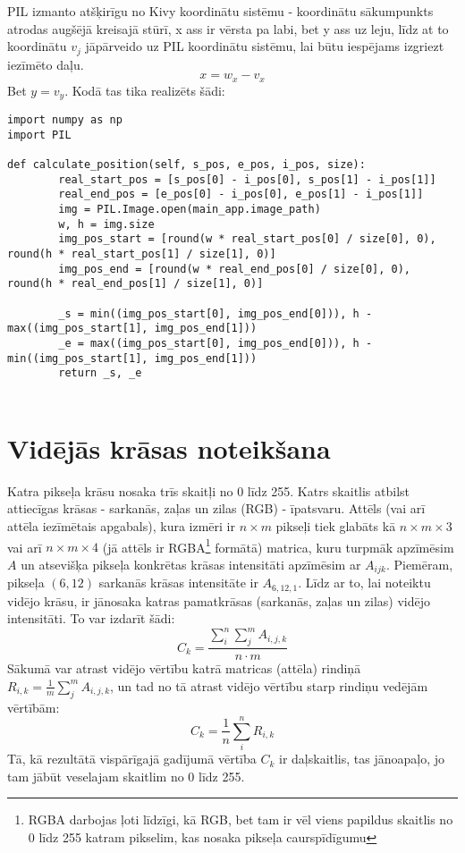 \documentclass{article}
\begin{document}
PIL izmanto atšķirīgu no Kivy koordinātu sistēmu - koordinātu sākumpunkts atrodas augšējā kreisajā stūrī, x ass ir vērsta pa labi, bet y ass uz leju, līdz at to koordinātu $v_j$ jāpārveido uz PIL koordinātu sistēmu, lai būtu iespējams izgriezt iezīmēto daļu.
$$
    x = w_x - v_x
$$
Bet $y = v_y$. Kodā tas tika realizēts šādi:

\begin{lstlisting}
import numpy as np
import PIL

def calculate_position(self, s_pos, e_pos, i_pos, size):
        real_start_pos = [s_pos[0] - i_pos[0], s_pos[1] - i_pos[1]]
        real_end_pos = [e_pos[0] - i_pos[0], e_pos[1] - i_pos[1]]
        img = PIL.Image.open(main_app.image_path)
        w, h = img.size
        img_pos_start = [round(w * real_start_pos[0] / size[0], 0), round(h * real_start_pos[1] / size[1], 0)]
        img_pos_end = [round(w * real_end_pos[0] / size[0], 0), round(h * real_end_pos[1] / size[1], 0)]

        _s = min((img_pos_start[0], img_pos_end[0])), h - max((img_pos_start[1], img_pos_end[1]))
        _e = max((img_pos_start[0], img_pos_end[0])), h - min((img_pos_start[1], img_pos_end[1]))
        return _s, _e
    
\end{lstlisting}

\section{Vidējās krāsas noteikšana}

Katra pikseļa krāsu nosaka trīs skaitļi no 0 līdz 255. Katrs skaitlis atbilst attiecīgas krāsas - sarkanās, zaļas un zilas (RGB) - īpatsvaru. Attēls (vai arī attēla iezīmētais apgabals), kura izmēri ir $n\times m$ pikseļi tiek glabāts kā $n\times m \times 3$ vai arī $n \times m \times 4$ (jā attēls ir RGBA\footnote{RGBA darbojas ļoti līdzīgi, kā RGB, bet tam ir vēl viens papildus skaitlis no 0 līdz 255 katram pikselim, kas nosaka pikseļa caurspīdīgumu} formātā) matrica, kuru turpmāk apzīmēsim $A$ un atsevišķa pikseļa konkrētas krāsas intensitāti apzīmēsim ar $A_{ijk}$. Piemēram, pikseļa $(6, 12)$ sarkanās krāsas intensitāte ir $A_{6,12,1}$. Līdz ar to, lai noteiktu vidējo krāsu, ir jānosaka katras pamatkrāsas (sarkanās, zaļas un zilas) vidējo intensitāti. To var izdarīt šādi:
$$
    C_{k} = \frac{\sum_i^n \sum_j^m A_{i,j,k}}{n\cdot m}
$$
Sākumā var atrast vidējo vērtību katrā matricas (attēla) rindiņā $ R_{i,k} = \frac{1}{m}\sum_j^m A_{i,j,k}$, un tad no tā atrast vidējo vērtību starp rindiņu vedējām vērtībām:
$$
    C_{k} = \frac{1}{n}\sum_i^n R_{i,k}
$$
Tā, kā rezultātā vispārīgajā gadījumā vērtība $C_{k}$ ir daļskaitlis, tas jānoapaļo, jo tam jābūt veselajam skaitlim no 0 līdz 255.
\end{document}
